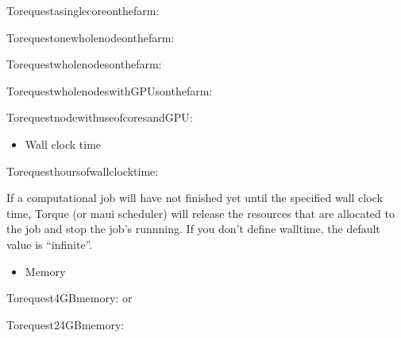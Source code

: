 \documentclass[a4paper,10pt,english]{sphinxmanual}
\begin{document}
\begin{sphinxVerbatim}[commandchars=\\\{\}]
Torequestasinglecoreonthefarm:

Torequestonewholenodeonthefarm:

Torequestwholenodesonthefarm:

TorequestwholenodeswithGPUsonthefarm:

TorequestnodewithuseofcoresandGPU:
\end{sphinxVerbatim}
\begin{itemize}
\item {} 
\sphinxAtStartPar
Wall clock time

\end{itemize}

\begin{sphinxVerbatim}[commandchars=\\\{\}]
Torequesthoursofwallclocktime:
\end{sphinxVerbatim}

\sphinxAtStartPar
If a computational job will have not finished yet until the specified wall clock time, Torque (or maui scheduler) will release the resources that are allocated to the job and stop the job’s runnning.
If you don’t define walltime, the default value is “infinite”.
\begin{itemize}
\item {} 
\sphinxAtStartPar
Memory

\end{itemize}

\begin{sphinxVerbatim}[commandchars=\\\{\}]
Torequest4GBmemory:
or

Torequest24GBmemory:
\end{sphinxVerbatim}
\end{document}
